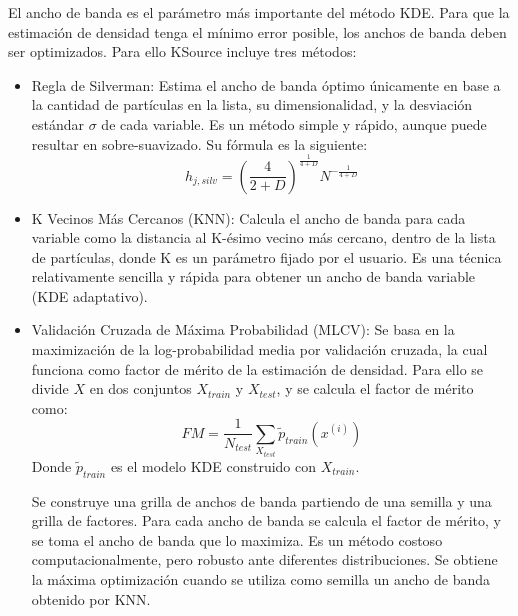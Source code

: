 El ancho de banda es el parámetro más importante del método KDE. Para que la estimación de densidad tenga el mínimo error posible, los anchos de banda deben ser optimizados. Para ello KSource incluye tres métodos:
\begin{itemize}
    \item Regla de Silverman: Estima el ancho de banda óptimo únicamente en base a la cantidad de partículas en la lista, su dimensionalidad, y la desviación estándar $\sigma$ de cada variable. Es un método simple y rápido, aunque puede resultar en sobre-suavizado. Su fórmula es la siguiente:
    \begin{equation}
        h_{j,silv} = \left(\frac{4}{2+D}\right)^{\frac{1}{4+D}} N^{-\frac{1}{4+D}}
    \end{equation}  
    \item K Vecinos Más Cercanos (KNN): Calcula el ancho de banda para cada variable como la distancia al K-ésimo vecino más cercano, dentro de la lista de partículas, donde K es un parámetro fijado por el usuario. Es una técnica relativamente sencilla y rápida para obtener un ancho de banda variable (KDE adaptativo). 
    \item Validación Cruzada de Máxima Probabilidad (MLCV): Se basa en la maximización de la log-probabilidad media por validación cruzada, la cual funciona como factor de mérito de la estimación de densidad. Para ello se divide $X$ en dos conjuntos $X_{train}$ y $X_{test}$, y se calcula el factor de mérito como:
    \begin{equation}
        FM = \frac{1}{N_{test}} \sum_{X_{test}} \tilde{p}_{train}(x^{(i)}) 
    \end{equation}
    Donde $\tilde{p}_{train}$ es el modelo KDE construido con $X_{train}$.

    Se construye una grilla de anchos de banda partiendo de una semilla y una grilla de factores. Para cada ancho de banda se calcula el factor de mérito, y se toma el ancho de banda que lo maximiza. Es un método costoso computacionalmente, pero robusto ante diferentes distribuciones. Se obtiene la máxima optimización cuando se utiliza como semilla un ancho de banda obtenido por KNN.
\end{itemize}

